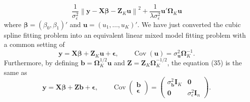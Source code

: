 \documentclass[11pt]{article}
\newcommand{\bs}{\boldsymbol}
\newcommand{\opn}{\operatorname}
\begin{document}
\begin{equation}
  \frac{1}{\sigma_{\epsilon}^{2}}\left\|\bs{y}-\bs{X\beta}-\bs{Z}_{K}\bs{u}\right\|^{2} + \frac{1}{\lambda\sigma_{\epsilon}^{2}}\bs{u}'\bs{\Omega}_{K}\bs{u}
\end{equation}
where $\bs{\beta}=\left(\beta_{0},\beta_{1}\right)'$ and $\bs{u}=\left(u_{1},\ldots , u_{K}\right)'$. We have just converted the cubic spline fitting problem into an equivalent linear mixed model fitting problem with a common setting of
\begin{equation}
  \bs{y}=\bs{X\beta}+\bs{Z}_{K}\bs{u} + \bs{\epsilon}, \qquad \opn{Cov}\left(\bs{u}\right) = \sigma_{\bs{u}}^{2}\bs{\Omega}_{K}^{-1}.
\end{equation}
Furthermore, by defining $\bs{b}=\bs{\Omega}_{K}^{1/2}\bs{u}$ and $\bs{Z}=\bs{Z}_{K}\bs{\Omega}_{K}^{-1/2}$, the equation (35) is the same as
\begin{equation}
  \bs{y}=\bs{X\beta} + \bs{Zb}+\bs{\epsilon}, \qquad \opn{Cov}\begin{pmatrix}\bs{b}\\ \bs{\epsilon} \end{pmatrix}=\begin{pmatrix} \sigma_{\bs{b}}^{2}\bs{I}_{K} & \bs{0}\\ \bs{0} & \sigma_{\epsilon}^{2}\bs{I}_{n}\end{pmatrix}.
\end{equation}
\end{document}

